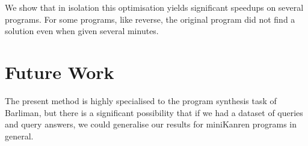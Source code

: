 \documentclass[submission,copyright,creativecommons]{eptcs}
\begin{document}
We show that in isolation this optimisation yields
significant speedups on several programs. For some programs, like
reverse, the original program did not find a solution even when given
several minutes.

\section{Future Work}

The present method is highly specialised to the program synthesis task
of Barliman, but there is a significant possibility that if we had a
dataset of queries and query answers, we could generalise our results
for miniKanren programs in general.



\end{document}
